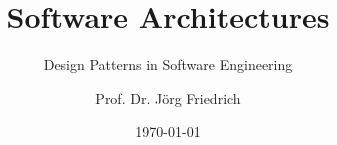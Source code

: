 \title[Software Architectures]{Software Architectures}

\subtitle[Design Patterns in Software Engineering]{Design Patterns in Software Engineering}

\author[Prof. Dr. Jörg Friedrich]{Prof. Dr. Jörg Friedrich}%



\date[\copyright{} 2015]{\today}

